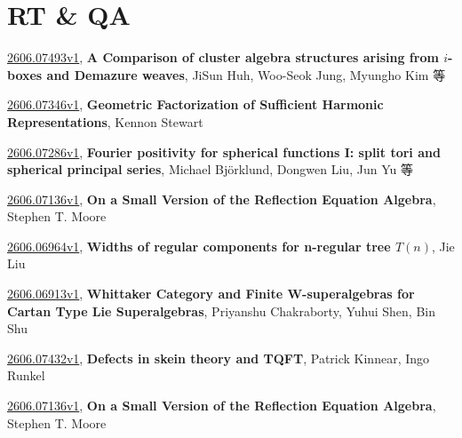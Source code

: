 \documentclass[9pt, a4paper]{article}
\theoremstyle{plain}
\theoremstyle{definition}
\theoremstyle{remark}
\newcommand{\arxiv}[3]{\href{https://arxiv.org/abs/#1}{#1}, \textbf{\textcolor{arxivblue}{#2}}, #3}
\begin{document}

\section{RT \& QA}
\arxiv{2606.07493v1}{A Comparison of cluster algebra structures arising from $i$-boxes and Demazure weaves}{JiSun Huh, Woo-Seok Jung, Myungho Kim 等}

\arxiv{2606.07346v1}{Geometric Factorization of Sufficient Harmonic Representations}{Kennon Stewart}

\arxiv{2606.07286v1}{Fourier positivity for spherical functions I: split tori and spherical principal series}{Michael Björklund, Dongwen Liu, Jun Yu 等}

\arxiv{2606.07136v1}{On a Small Version of the Reflection Equation Algebra}{Stephen T. Moore}

\arxiv{2606.06964v1}{Widths of regular components for n-regular tree $T(n)$}{Jie Liu}

\arxiv{2606.06913v1}{Whittaker Category and Finite W-superalgebras for Cartan Type Lie Superalgebras}{Priyanshu Chakraborty, Yuhui Shen, Bin Shu}

\arxiv{2606.07432v1}{Defects in skein theory and TQFT}{Patrick Kinnear, Ingo Runkel}

\arxiv{2606.07136v1}{On a Small Version of the Reflection Equation Algebra}{Stephen T. Moore}

\end{document}
